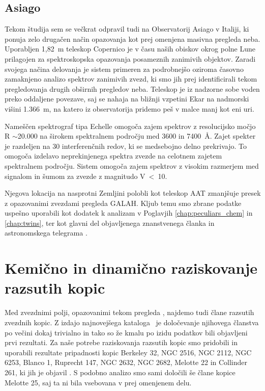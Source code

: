 \subsection{Asiago}
\label{sec:slo_asiago}
Tekom študija sem se večkrat odpravil tudi na Observatorij Asiago v Italiji, ki ponuja zelo drugačen način opazovanja kot prej omenjena masivna pregleda neba. Uporabljen 1,82~m teleskop Copernico je v času naših obiskov okrog polne Lune prilagojen za spektroskopska opazovanja posameznih zanimivih objektov. Zaradi svojega načina delovanja je sistem primeren za podrobnejšo oziroma časovno zamaknjeno analizo spektrov zanimivih zvezd, ki smo jih prej identificirali tekom pregledovanja drugih obširnih pregledov neba. Teleskop je iz nadzorne sobe voden preko oddaljene povezave, saj se nahaja na bližnji vzpetini Ekar na nadmorski višini 1.366~m, na katero iz observatorija pridemo peš v malce manj kot eni uri. 

Nameščen spektrograf tipa Echelle omogoča zajem spektrov z resolucijsko močjo R $\sim$20.000 na širokem spektralnem področju med 3600 in 7400~\AA. Zajet spekter je razdeljen na 30 interferenčnih redov, ki se medsebojno delno prekrivajo. To omogoča izdelavo neprekinjenega spektra zvezde na celotnem zajetem spektralnem področju. Sistem omogoča zajem spektrov z visokim razmerjem med signalom in šumom za zvezde z magnitudo V~<~10. 

Njegova lokacija na nasprotni Zemljini polobli kot teleskop AAT zmanjšuje presek z opazovanimi zvezdami pregleda GALAH. Kljub temu smo zbrane podatke uspešno uporabili kot dodatek k analizam v Poglavjih \ref{chap:peculiars_chem} in \ref{chap:twins}, ter kot glavni del objavljenega znanstvenega članka \cite{2019MNRAS.488.5536M} in astronomskega telegrama \cite{2019ATel13340....1M}.

\section{Kemično in dinamično raziskovanje razsutih kopic}
\label{sec:slo_kopice_taziskovanje}
Med zvezdnimi polji, opazovanimi tekom pregleda \Gh, najdemo tudi člane razsutih zvezdnih kopic. Z izdajo najnovejšega kataloga \Gs\ je določevanje njihovega članstva po večini dokaj trivialno in tako so že kmalu po izidu podatkov bili objavljeni prvi rezultati. Za naše potrebe raziskovanja razsutih kopic smo pridobili in uporabili rezultate pripadnosti kopic Berkeley 32, NGC 2516, NGC 2112, NGC 6253, Blanco 1, Ruprecht 147, NGC 2632, NGC 2682,  Melotte 22 in Collinder 261, ki jih je objavil \citet{2018A&A...618A..93C}. S podobno analizo smo sami določili še člane kopice Melotte 25, saj ta ni bila vsebovana v prej omenjenem delu.

